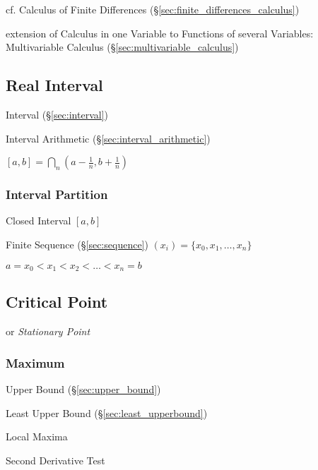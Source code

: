 \fist cf. Calculus of Finite Differences
(\S\ref{sec:finite_differences_calculus})

\fist extension of Calculus in one Variable to Functions of several Variables:
Multivariable Calculus (\S\ref{sec:multivariable_calculus})



\subsection{Real Interval}\label{sec:real_interval}

Interval (\S\ref{sec:interval})

Interval Arithmetic (\S\ref{sec:interval_arithmetic})

$[a,b] = \bigcap_n (a - \frac{1}{n}, b + \frac{1}{n})$



\subsubsection{Interval Partition}\label{sec:interval_partition}

Closed Interval $[a,b]$

Finite Sequence (\S\ref{sec:sequence}) $(x_i) = \{ x_0, x_1, \ldots,
x_n \}$

$a = x_0 < x_1 < x_2 < \ldots < x_n = b$



\subsection{Critical Point}\label{sec:critical_point}

or \emph{Stationary Point}



\subsubsection{Maximum}\label{sec:maximum}

Upper Bound (\S\ref{sec:upper_bound})

Least Upper Bound (\S\ref{sec:least_upperbound})

Local Maxima

Second Derivative Test

